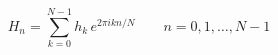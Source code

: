 \documentclass{article}
\begin{document}
\begin{equation*}
  H_n = \sum_{k=0}^{N-1} h_k \, e^{2\pi i k n/N} \qquad n = 0, 1, \dots, N-1
\end{equation*}
\end{document}
